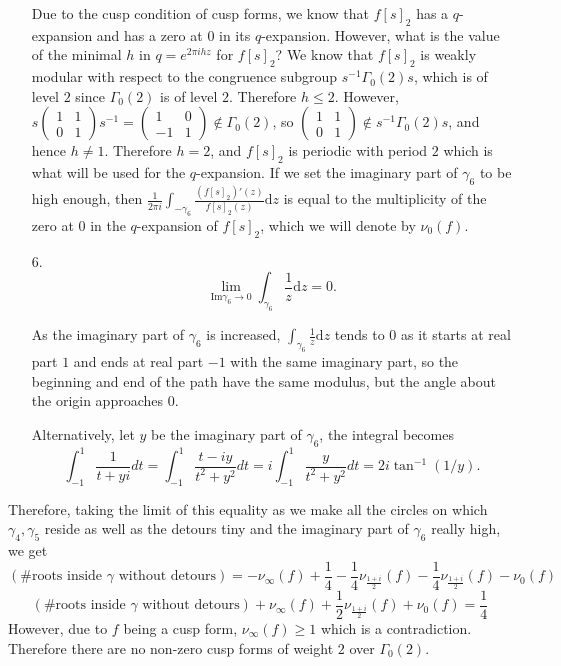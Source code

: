 \documentclass{article}
\theoremstyle{definition}
\theoremstyle{definition}
\theoremstyle{definition}
\begin{document}
\begin{itemize}
Due to the cusp condition of cusp forms, we know that $f [s]_2$ has a
$q$-expansion and has a zero at $0$ in its $q$-expansion. However, what is the
value of the minimal $h$ in $q = e^{2 \pi ihz}$ for $f [s]_2$? We know that $f
[s]_2$ is weakly modular with respect to the congruence subgroup $s^{- 1}
\Gamma_0 (2) s$, which is of level $2$ since $\Gamma_0 (2)$ is of level $2$.
Therefore $h \leqslant 2$. However, $s \begin{pmatrix}
  1 & 1\\
  0 & 1
\end{pmatrix} s^{- 1} = \begin{pmatrix}
  1 & 0\\
  - 1 & 1
\end{pmatrix} \not\in \Gamma_0 (2)$, so $\begin{pmatrix}
  1 & 1\\
  0 & 1
\end{pmatrix} \not\in s^{- 1} \Gamma_0 (2) s$, and hence $h \neq 1$.
Therefore $h = 2$, and $f [s]_2$ is periodic with period $2$ which is what
will be used for the $q$-expansion. If we set the imaginary part of $\gamma_6$
to be high enough, then $\frac{1}{2 \pi i}  \int_{- \gamma_6} \frac{(f [s]_2)'
(z)}{f[s]_2 (z)} \mathrm{d} z$ is equal to the multiplicity of the zero at $0$ in the
$q$-expansion of $f [s]_2$, which we will denote by $\nu_0 (f)$.

\item[6.] $$\lim_{\text{Im}\gamma_6\to0}\int_{\gamma_6} \frac{1}{z}
\mathrm{d}z =0.$$ 

As the imaginary part of $\gamma_6$ is increased, $\int_{\gamma_6} \frac{1}{z}
\mathrm{d} z$ tends to $0$ as it starts at real part $1$ and ends at real part $-
1$ with the same imaginary part, so the beginning and end of the path have the
same modulus, but the angle about the origin approaches $0$. 

Alternatively, let $y$ be the imaginary part of $\gamma_6$, the integral becomes
$$\int_{-1}^1 \frac{1}{t+yi}dt=\int_{-1}^1 \frac{t-iy}{t^2+y^2}dt=i\int_{-1}^1 \frac{y}{t^2+y^2}dt=2i\tan^{-1}(1/y).$$



\end{itemize}

Therefore, taking the limit of this equality as we make all the circles on
which $\gamma_4, \gamma_5$ reside as well as the detours tiny and the
imaginary part of $\gamma_6$ really high, we get
\[ \left( \text{\# roots inside $\gamma$ without detours} \right) = -
   \nu_{\infty} (f) + \frac{1}{4} - \frac{1}{4} \nu_{\frac{1 + i}{2}}
   (f) - \frac{1}{4} \nu_{\frac{1 + i}{2}} (f) - \nu_0 (f) \]
\[ \left( \text{\# roots inside $\gamma$ without detours} \right) +
   \nu_{\infty} (f) + \frac{1}{2} \nu_{\frac{1 + i}{2}} (f) + \nu_0 (f) =
   \frac{1}{4} \]
However, due to $f$ being a cusp form, $\nu_{\infty} (f) \geqslant 1$ which is
a contradiction. Therefore there are no non-zero cusp forms of weight $2$ over
$\Gamma_0 (2)$.
\end{document}
